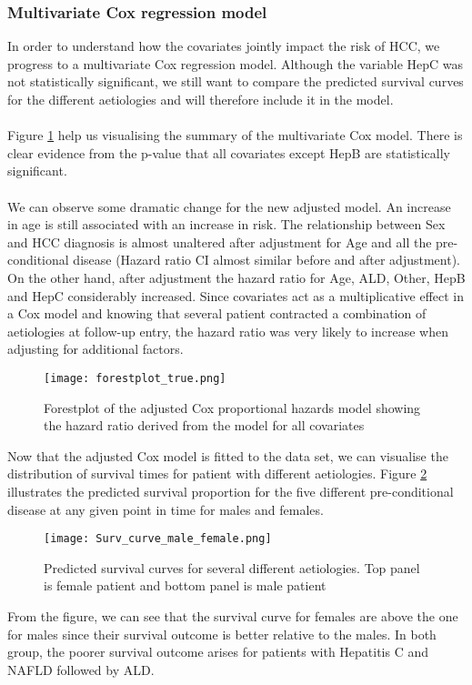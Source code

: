 \documentclass[11pt,twoside]{article}
\numberwithin{Theorem}{section}
\numberwithin{Definition}{section}
\numberwithin{Lemma}{section}
\numberwithin{Algorithm}{section}
\numberwithin{equation}{section}
\begin{document}
\subsubsection{Multivariate Cox regression model}
In order to understand how the covariates jointly impact the risk of HCC, we progress to a multivariate Cox regression model. Although the variable HepC was not statistically significant, we still want to compare the predicted survival curves for the different aetiologies and will therefore include it in the model.
\\ \\
Figure \ref{fig:forest_cox} help us visualising the summary of the multivariate Cox model. There is clear evidence from the p-value that all covariates except HepB are statistically significant. \\ \\
We can observe some dramatic change for the new adjusted model. An increase in age is still associated with an increase in risk. The relationship between Sex and HCC diagnosis is almost unaltered after adjustment for Age and all the pre-conditional disease (Hazard ratio CI almost similar before and after adjustment).
On the other hand, after adjustment the hazard ratio for Age, ALD, Other, HepB and HepC considerably increased. Since covariates act as a multiplicative effect in a Cox model and knowing that several patient contracted a combination of aetiologies at follow-up entry, the hazard ratio was very likely to increase when adjusting for additional factors.
%
\begin{figure}[h!]
    \centering
    \texttt{[image: forestplot\_true.png]}
    \caption{Forestplot of the adjusted Cox proportional hazards model showing the hazard ratio derived from the model for all covariates}
    \label{fig:forest_cox}
\end{figure}
%
Now that the adjusted Cox model is fitted to the data set, we can visualise the distribution of survival times for patient with different aetiologies. Figure \ref{fig:pred_surv_curv_mf} illustrates the predicted survival proportion for the five different pre-conditional disease at any given point in time for males and females.
\begin{figure}[h!]
    \centering
    \texttt{[image: Surv\_curve\_male\_female.png]}
    \caption{Predicted survival curves for several different aetiologies. Top panel is female patient and bottom panel is male patient}
    \label{fig:pred_surv_curv_mf}
\end{figure}
From the figure, we can see that the survival curve for females are above the one for males since their survival outcome is better relative to the males. In both group, the poorer survival outcome arises for patients with Hepatitis C and NAFLD followed by ALD.\\ \\
%
%
%
\end{document}
